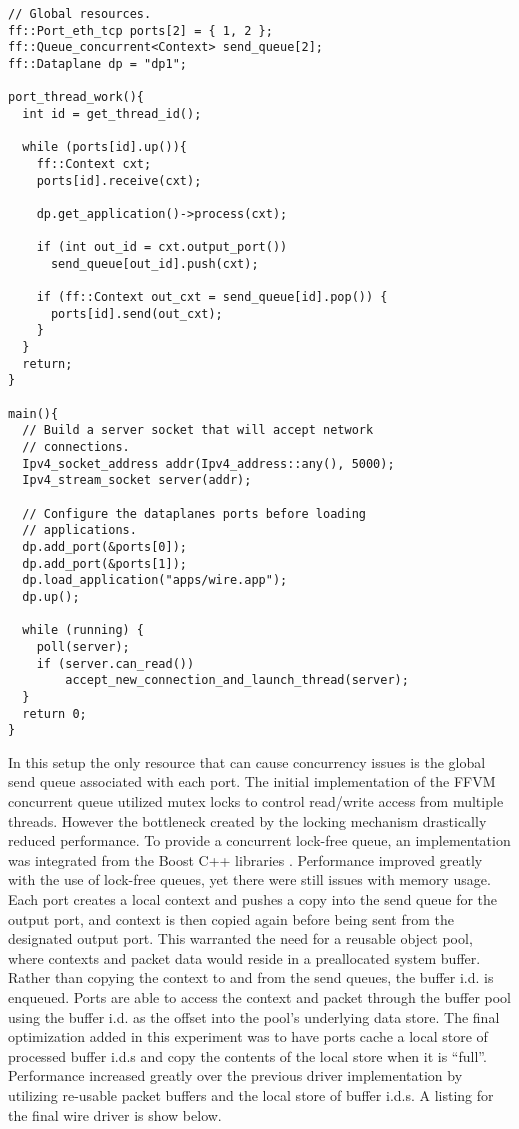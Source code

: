 \begin{lstlisting}
// Global resources.
ff::Port_eth_tcp ports[2] = { 1, 2 };
ff::Queue_concurrent<Context> send_queue[2];
ff::Dataplane dp = "dp1";

port_thread_work(){
  int id = get_thread_id();

  while (ports[id].up()){
    ff::Context cxt;
    ports[id].receive(cxt);

    dp.get_application()->process(cxt);

    if (int out_id = cxt.output_port())
      send_queue[out_id].push(cxt);

    if (ff::Context out_cxt = send_queue[id].pop()) {
      ports[id].send(out_cxt);
    }
  }
  return;
}

main(){
  // Build a server socket that will accept network
  // connections.
  Ipv4_socket_address addr(Ipv4_address::any(), 5000);
  Ipv4_stream_socket server(addr);

  // Configure the dataplanes ports before loading
  // applications.
  dp.add_port(&ports[0]);
  dp.add_port(&ports[1]);
  dp.load_application("apps/wire.app");
  dp.up();

  while (running) {
  	poll(server);
  	if (server.can_read())
  		accept_new_connection_and_launch_thread(server);
  }
  return 0;
}
\end{lstlisting}

In this setup the only resource that can cause concurrency issues is the global
send queue associated with each port. The initial implementation of the FFVM
concurrent queue utilized mutex locks to control read/write access from multiple
threads. However the bottleneck created by the locking mechanism drastically
reduced performance. To provide a concurrent lock-free queue, an implementation
was integrated from the Boost C++ libraries \cite{boost}. Performance improved
greatly with the use of lock-free queues, yet there were still issues with
memory usage. Each port creates a local context and pushes a copy into the
send queue for the output port, and context is then copied again before being
sent from the designated output port. This warranted the need for a reusable
object pool, where contexts and packet data would reside in a preallocated
system buffer. Rather than copying the context to and from the send queues, the
buffer i.d. is enqueued. Ports are able to access the context and packet through
the buffer pool using the buffer i.d. as the offset into the pool's underlying
data store. The final optimization added in this experiment was to have ports
cache a local store of processed buffer i.d.s and copy the contents of the local
store when it is ``full''. Performance increased greatly over the previous driver
implementation by utilizing re-usable packet buffers and the local store of
buffer i.d.s. A listing for the final wire driver is show below.

